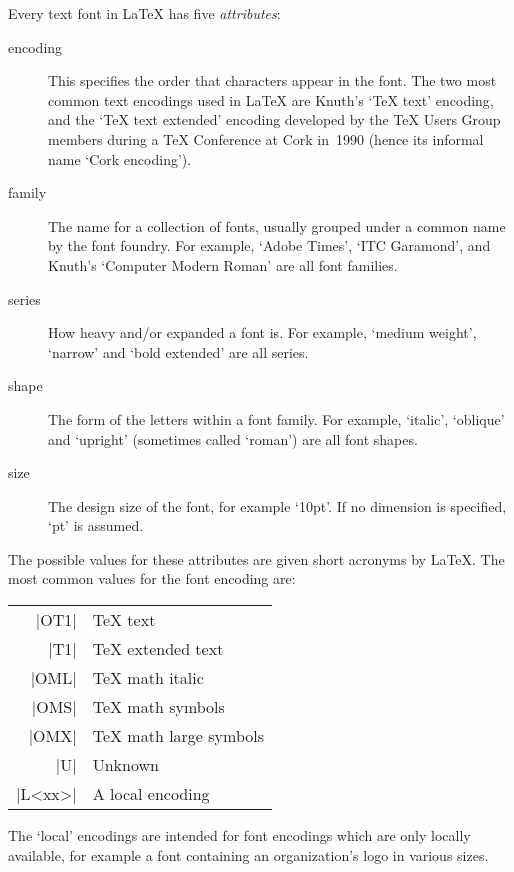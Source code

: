 \documentclass{ltxguide}[1995/11/28]
\begin{document}
Every text font in \LaTeX{} has five \emph{attributes}:
\begin{description}
 
\item[encoding] This specifies the order that characters appear in the
   font.  The two most common text encodings used in \LaTeX{} are
   Knuth's `\TeX{} text' encoding, and the `\TeX{} text extended'
   encoding developed by the \TeX{} Users Group members during a \TeX{}
   Conference at Cork in~1990 (hence its informal name `Cork encoding').
 
\item[family] The name for a collection of fonts, usually grouped under
   a common name by the font foundry.  For example, `Adobe Times', `ITC
   Garamond', and Knuth's `Computer Modern Roman' are all font families.
 
\item[series] How heavy and/or expanded a font is.  For example, `medium
   weight', `narrow' and `bold extended' are all series.
 
\item[shape] The form of the letters within a font family.  For
   example, `italic', `oblique' and `upright' (sometimes called
   `roman') are all font shapes.
 
\item[size] The design size of the font, for example `10pt'. If no
   dimension is specified, `pt' is assumed.
 
\end{description}
The possible values for these attributes are given short acronyms by
\LaTeX.  The most common values for the font encoding are:
\begin{center}
\begin{minipage}{.7\linewidth}
   \begin{tabular}{rl}
      |OT1|   & \TeX{} text  \\
      |T1|    & \TeX{} extended text \\
      |OML|   & \TeX{} math italic \\
      |OMS|   & \TeX{} math symbols \\
      |OMX|   & \TeX{} math large symbols \\
      |U|     & Unknown \\
      |L<xx>| & A local encoding
   \end{tabular}
\end{minipage}
\end{center}
The `local' encodings are intended for font encodings which are only
locally available, for example a font containing an organization's
logo in various sizes.
 
\end{document}
